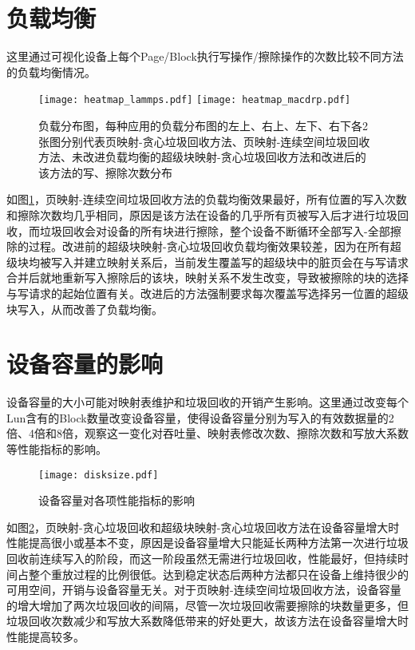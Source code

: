 \section{负载均衡}

这里通过可视化设备上每个Page/Block执行写操作/擦除操作的次数比较不同方法的负载均衡情况。

\begin{figure}[H]
    \centering
      {\texttt{[image: heatmap\_lammps.pdf]}}
    \vspace{4em}
        {\texttt{[image: heatmap\_macdrp.pdf]}}
    \caption[负载分布图]{负载分布图，每种应用的负载分布图的左上、右上、左下、右下各2张图分别代表页映射-贪心垃圾回收方法、页映射-连续空间垃圾回收方法、未改进负载均衡的超级块映射-贪心垃圾回收方法和改进后的该方法的写、擦除次数分布}
    \label{fig:res_heatmap}
\end{figure}

如图\ref{fig:res_heatmap}，页映射-连续空间垃圾回收方法的负载均衡效果最好，所有位置的写入次数和擦除次数均几乎相同，原因是该方法在设备的几乎所有页被写入后才进行垃圾回收，而垃圾回收会对设备的所有块进行擦除，整个设备不断循环全部写入-全部擦除的过程。改进前的超级块映射-贪心垃圾回收负载均衡效果较差，因为在所有超级块均被写入并建立映射关系后，当前发生覆盖写的超级块中的脏页会在与写请求合并后就地重新写入擦除后的该块，映射关系不发生改变，导致被擦除的块的选择与写请求的起始位置有关。改进后的方法强制要求每次覆盖写选择另一位置的超级块写入，从而改善了负载均衡。

\section{设备容量的影响}

设备容量的大小可能对映射表维护和垃圾回收的开销产生影响。这里通过改变每个Lun含有的Block数量改变设备容量，使得设备容量分别为写入的有效数据量的2倍、4倍和8倍，观察这一变化对吞吐量、映射表修改次数、擦除次数和写放大系数等性能指标的影响。

\begin{figure}[H]
    \centering
    \texttt{[image: disksize.pdf]}
    \caption{设备容量对各项性能指标的影响}
    \label{fig:res_disksize}
\end{figure}

如图\ref{fig:res_disksize}，页映射-贪心垃圾回收和超级块映射-贪心垃圾回收方法在设备容量增大时性能提高很小或基本不变，原因是设备容量增大只能延长两种方法第一次进行垃圾回收前连续写入的阶段，而这一阶段虽然无需进行垃圾回收，性能最好，但持续时间占整个重放过程的比例很低。达到稳定状态后两种方法都只在设备上维持很少的可用空间，开销与设备容量无关。对于页映射-连续空间垃圾回收方法，设备容量的增大增加了两次垃圾回收的间隔，尽管一次垃圾回收需要擦除的块数量更多，但垃圾回收次数减少和写放大系数降低带来的好处更大，故该方法在设备容量增大时性能提高较多。

